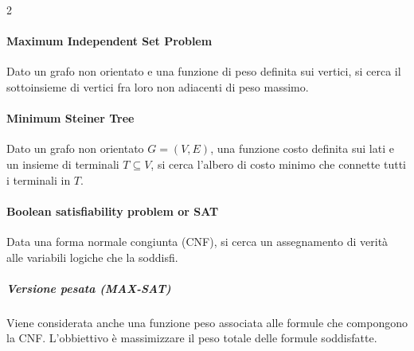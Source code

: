 \documentclass[\main/main.tex]{subfiles}
\begin{document}
\begin{multicols}{2}
  \paragraph*{Maximum Independent Set Problem}
  Dato un grafo non orientato e una funzione di peso definita sui vertici, si cerca il sottoinsieme di vertici fra loro non adiacenti di peso massimo.

  \paragraph*{Minimum Steiner Tree}
  Dato un grafo non orientato \(G=(V,E)\), una funzione costo definita sui lati e un insieme di terminali \(T \subseteq V\), si cerca l'albero di costo minimo che connette tutti i terminali in \(T\).

  \paragraph*{Boolean satisfiability problem or SAT}
  Data una forma normale congiunta (CNF), si cerca un assegnamento di verità alle variabili logiche che la soddisfi.

  \subparagraph*{Versione pesata (MAX-SAT)}
  Viene considerata anche una funzione peso associata alle formule che compongono la CNF. L'obbiettivo è massimizzare il peso totale delle formule soddisfatte.
\end{multicols}
\end{document}
